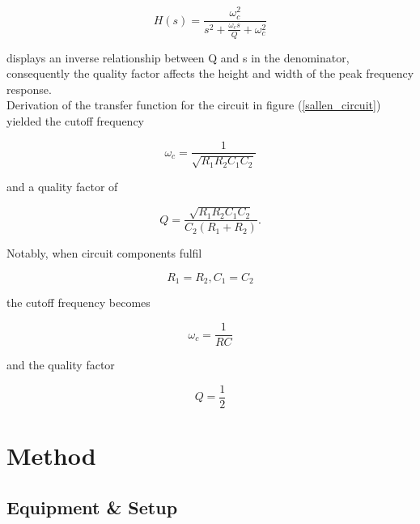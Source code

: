 \documentclass{scrartcl}
\begin{document}
\begin{equation}
    H(s) = \frac{\omega_c^2}{s^2+\frac{\omega_cs}{Q}+\omega_c^2}
\end{equation}

displays an inverse relationship between Q and s in the denominator, consequently the quality factor affects the height and width of the peak frequency response. \\ \newline
%
Derivation of the transfer function for the circuit in figure (\ref{sallen_circuit}) yielded the cutoff frequency

\begin{equation}
    \omega_c=\frac{1}{\sqrt{R_1R_2C_1C_2}}
\end{equation}

and a quality factor of

\begin{equation}
    Q = \frac{\sqrt{R_1R_2C_1C_2}}{C_2(R_1+R_2)}.
\end{equation}

Notably, when circuit components fulfil

\begin{equation}
    R_1 = R_2, C_1 = C_2
\end{equation}

the cutoff frequency becomes

\begin{equation}
    \omega_c = \frac{1}{RC}
\end{equation}

and the quality factor

\begin{equation}
    Q = \frac{1}{2}
\end{equation}

\section{Method} %
\subsection{Equipment \& Setup}
\end{document}
